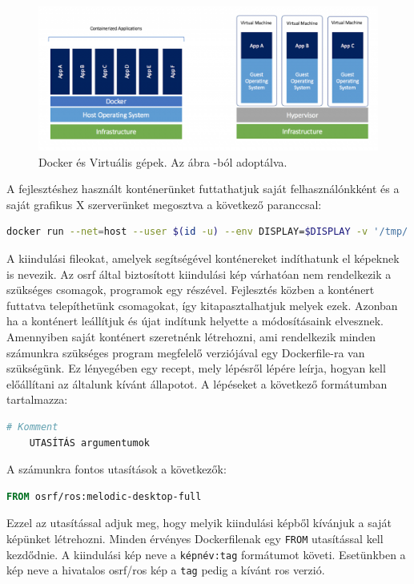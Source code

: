 \begin{figure}
    \centering
    \includegraphics[width=\linewidth]{figures/docker_vs_vm.png}
    \caption{Docker és Virtuális gépek. Az ábra \cite{jenny_are_2018}-ból adoptálva.}
    \label{fig:container_vs_vm}
\end{figure}

A fejlesztéshez használt konténerünket futtathatjuk saját felhasználónkként és a saját grafikus X szerverünket megosztva a következő paranccsal:
\begin{lstlisting}[language=bash]
    docker run --net=host --user $(id -u) --env DISPLAY=$DISPLAY -v '/tmp/.X11-unix:/tmp/.X11-unix:rw' kontener_neve
\end{lstlisting}

A kiindulási fileokat, amelyek segítségével konténereket indíthatunk el képeknek is nevezik. Az osrf által biztosított kiindulási kép várhatóan nem rendelkezik a szükséges csomagok, programok egy részével. Fejlesztés közben a konténert futtatva telepíthetünk csomagokat, így kitapasztalhatjuk melyek ezek. Azonban ha a konténert leállítjuk és újat indítunk helyette a módosításaink elvesznek. Amennyiben saját konténert szeretnénk létrehozni, ami rendelkezik minden számunkra szükséges program megfelelő verziójával egy Dockerfile-ra van szükségünk. Ez lényegében egy recept, mely lépésről lépére leírja, hogyan kell előállítani az általunk kívánt állapotot. A lépéseket a következő formátumban tartalmazza:

\begin{lstlisting}[language=Dockerfile]
    # Komment
    UTASÍTÁS argumentumok
\end{lstlisting}

A számunkra fontos utasítások a következők:

\begin{lstlisting}[language=Dockerfile]
    FROM osrf/ros:melodic-desktop-full
\end{lstlisting}
Ezzel az utasítással adjuk meg, hogy melyik kiindulási képből kívánjuk a saját képünket létrehozni. Minden érvényes Dockerfilenak egy \lstinline{FROM} utasítással kell kezdődnie. A kiindulási kép neve a \lstinline{képnév:tag} formátumot követi. Esetünkben a kép neve a hivatalos osrf/ros kép a \lstinline{tag} pedig a kívánt ros verzió.

